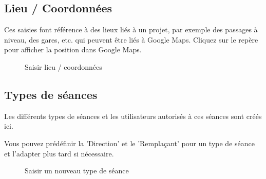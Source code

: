 \subsection{Lieu / Coordonnées}

Ces saisies font référence à des lieux liés à un projet, par exemple des passages à niveau, des gares, etc. qui peuvent être liés à Google Maps. Cliquez sur le repère pour afficher la position dans Google Maps.

\begin{figure}[H]
\caption{Saisir lieu / coordonnées}
\end{figure}

\clearpage
\subsection{Types de séances}

Les différents types de séances et les utilisateurs autorisés à ces séances sont créés ici.

\vspace{\baselineskip}


Vous pouvez prédéfinir la 'Direction' et le 'Remplaçant' pour un type de séance et l'adapter plus tard si nécessaire.

\begin{figure}[H]
\caption{Saisir un nouveau type de séance}
\end{figure}

